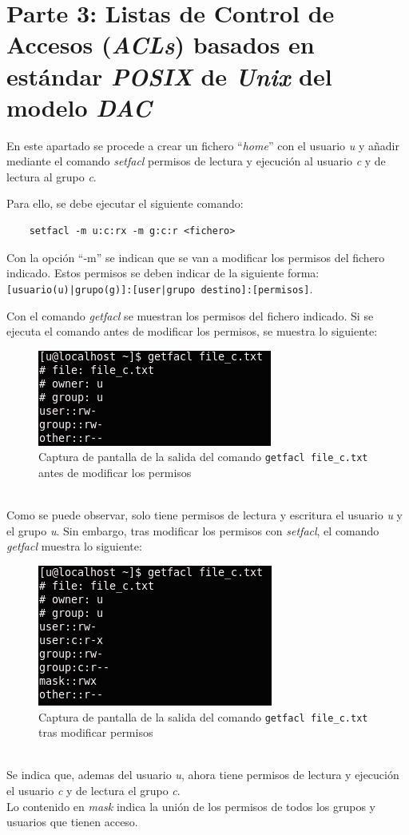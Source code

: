 \documentclass[10pt,a4paper]{article}
\begin{document}
\section{Parte 3: Listas de Control de Accesos (\emph{ACLs}) basados en estándar \emph{POSIX} de \emph{Unix} del modelo \emph{DAC}}
En este apartado se procede a crear un fichero ``\textit{home}'' con el usuario \textit{u} y añadir mediante el comando \textit{setfacl} permisos de lectura y ejecución al usuario \textit{c} y de lectura al grupo \textit{c}. \par
Para ello, se debe ejecutar el siguiente comando: 
\begin{lstlisting}
	setfacl -m u:c:rx -m g:c:r <fichero>
\end{lstlisting}
Con la opción ``-m'' se indican que se van a modificar los permisos del fichero indicado. Estos permisos se deben indicar de la siguiente forma: \texttt{[usuario(u)|grupo(g)]:[user|grupo destino]:[permisos]}. \par
Con el comando \textit{getfacl} se muestran los permisos del fichero indicado. Si se ejecuta el comando antes de modificar los permisos, se muestra lo siguiente:
\begin{figure}[h!]
	\centering
	\includegraphics[scale=0.7]{images/parte3_13a.png}
	\caption{Captura de pantalla de la salida del comando \texttt{getfacl file\_c.txt} antes de modificar los permisos}
	\label{fig:parte3_13a}
\end{figure}\\

Como se puede observar, solo tiene permisos de lectura y escritura el usuario \textit{u} y el grupo \textit{u}.
Sin embargo, tras modificar los permisos con \textit{setfacl}, el comando \textit{getfacl} muestra lo siguiente:
\begin{figure}[h!]
	\centering
	\includegraphics[scale=0.7]{images/parte3_13b.png}
	\caption{Captura de pantalla de la salida del comando \texttt{getfacl file\_c.txt} tras modificar permisos}
	\label{fig:parte3_13b}
\end{figure}\\
Se indica que, ademas del usuario \textit{u}, ahora tiene permisos de lectura y ejecución el usuario \textit{c} y de lectura el grupo \textit{c}.\\
Lo contenido en \textit{mask} indica la unión de los permisos de todos los grupos y usuarios que tienen acceso. 
\end{document}
